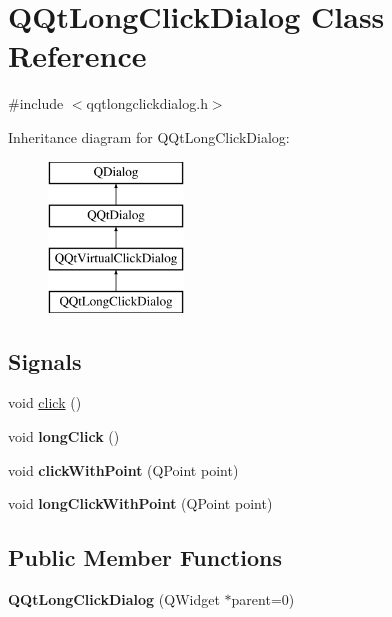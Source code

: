 \hypertarget{class_q_qt_long_click_dialog}{}\section{Q\+Qt\+Long\+Click\+Dialog Class Reference}
\label{class_q_qt_long_click_dialog}


{\ttfamily \#include $<$qqtlongclickdialog.\+h$>$}

Inheritance diagram for Q\+Qt\+Long\+Click\+Dialog\+:\begin{figure}[H]
\begin{center}
\leavevmode
\includegraphics[height=4.000000cm]{class_q_qt_long_click_dialog}
\end{center}
\end{figure}
\subsection*{Signals}
\begin{DoxyCompactItemize}
\item 
void \mbox{\hyperlink{class_q_qt_long_click_dialog_a470d4f0c26b44aeda6723469c610585a}{click}} ()
\item 
\mbox{\label{class_q_qt_long_click_dialog_a1366b9223e267edd2a726c4330dfe808}} 
void {\bfseries long\+Click} ()
\item 
\mbox{\label{class_q_qt_long_click_dialog_afa9a93e1ef855d32bac54871757ccb5b}} 
void {\bfseries click\+With\+Point} (Q\+Point point)
\item 
\mbox{\label{class_q_qt_long_click_dialog_aa675af655bb243fd050d2f9643b25a38}} 
void {\bfseries long\+Click\+With\+Point} (Q\+Point point)
\end{DoxyCompactItemize}
\subsection*{Public Member Functions}
\begin{DoxyCompactItemize}
\item 
\mbox{\label{class_q_qt_long_click_dialog_a771419961510dce9ff27c39b8cf3428a}} 
{\bfseries Q\+Qt\+Long\+Click\+Dialog} (Q\+Widget $\ast$parent=0)
\end{DoxyCompactItemize}
